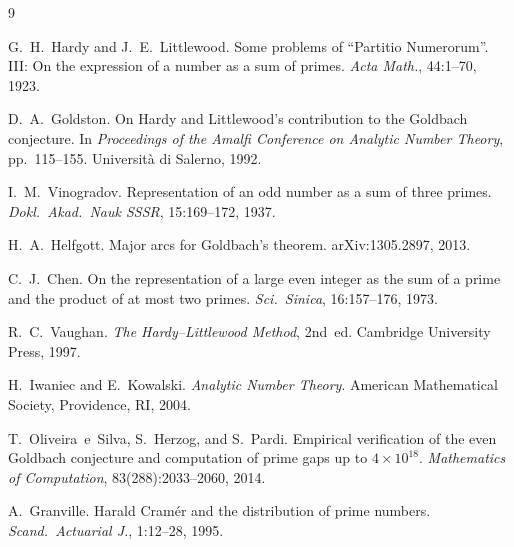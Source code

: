 \documentclass[12pt,a4paper]{amsart}
\theoremstyle{definition}
\begin{document}
\begin{thebibliography}{9}

G.~H.~Hardy and J.~E.~Littlewood.
\newblock Some problems of ``Partitio Numerorum''.  III: On the expression of
  a number as a sum of primes.
\newblock \emph{Acta Math.}, 44:1--70, 1923.

D.~A.~Goldston.
\newblock On Hardy and Littlewood's contribution to the Goldbach conjecture.
\newblock In \emph{Proceedings of the Amalfi Conference on Analytic Number
  Theory}, pp.\ 115--155.  Universit\`a di Salerno, 1992.

I.~M.~Vinogradov.
\newblock Representation of an odd number as a sum of three primes.
\newblock \emph{Dokl.\ Akad.\ Nauk SSSR}, 15:169--172, 1937.

H.~A.~Helfgott.
\newblock Major arcs for Goldbach's theorem.
\newblock arXiv:1305.2897, 2013.

C.~J.~Chen.
\newblock On the representation of a large even integer as the sum of a prime
  and the product of at most two primes.
\newblock \emph{Sci.\ Sinica}, 16:157--176, 1973.

R.~C.~Vaughan.
\newblock \emph{The Hardy--Littlewood Method}, 2nd~ed.
\newblock Cambridge University Press, 1997.

H.~Iwaniec and E.~Kowalski.
\newblock \emph{Analytic Number Theory}.
\newblock American Mathematical Society, Providence, RI, 2004.

T.~Oliveira~e~Silva, S.~Herzog, and S.~Pardi.
\newblock Empirical verification of the even Goldbach conjecture and computation
  of prime gaps up to $4 \times 10^{18}$.
\newblock \emph{Mathematics of Computation}, 83(288):2033--2060, 2014.

A.~Granville.
\newblock Harald Cram\'er and the distribution of prime numbers.
\newblock \emph{Scand.\ Actuarial J.}, 1:12--28, 1995.

\end{thebibliography}
\end{document}
